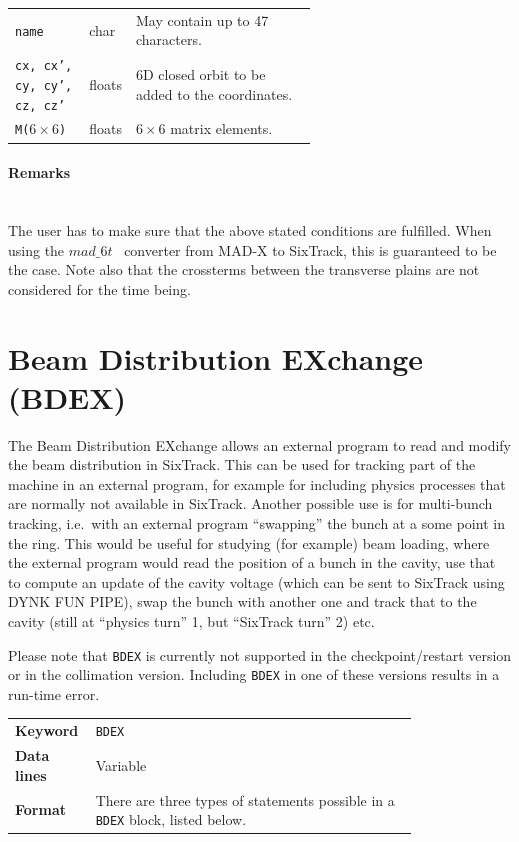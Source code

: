 \bigskip
\begin{tabular}{@{}llp{0.6\linewidth}}
    \texttt{name} & char & May contain up to 47 characters. \\
    \texttt{cx, cx', cy, cy', cz, cz'} & floats & 6D closed orbit to be added to the coordinates. \\
    \texttt{M($ 6 \times 6$)} & floats & $ 6 \times 6$ matrix elements.
\end{tabular}

\paragraph{Remarks}~\\

The user has to make sure that the above stated conditions are fulfilled.
When using the $mad\_6t$~\cite{CONVERTOR} converter from MAD-X to SixTrack, this is guaranteed to be the case.
Note also that the crossterms between the transverse plains are not considered for the time being.

\section{Beam Distribution EXchange (BDEX)} \label{sec:BDEX}

The Beam Distribution EXchange allows an external program to read and modify the beam distribution in SixTrack.
This can be used for tracking part of the machine in an external program, for example for including physics processes that are normally not available in SixTrack.
Another possible use is for multi-bunch tracking, i.e.\ with an external program ``swapping'' the bunch at a some point in the ring.
This would be useful for studying (for example) beam loading, where the external program would read the position of a bunch in the cavity, use that to compute an update of the cavity voltage (which can be sent to SixTrack using DYNK FUN PIPE), swap the bunch with another one and track that to the cavity (still at ``physics turn'' 1, but ``SixTrack turn'' 2) etc.

Please note that \texttt{BDEX} is currently not supported in the checkpoint/restart version or in the collimation version.
Including \texttt{BDEX} in one of these versions results in a run-time error.

\bigskip
\begin{tabular}{@{}lp{0.8\linewidth}}
    \textbf{Keyword}    & \texttt{BDEX} \\
    \textbf{Data lines} & Variable \\
    \textbf{Format}     & There are three types of statements possible in a \texttt{BDEX} block, listed below.
\end{tabular}

